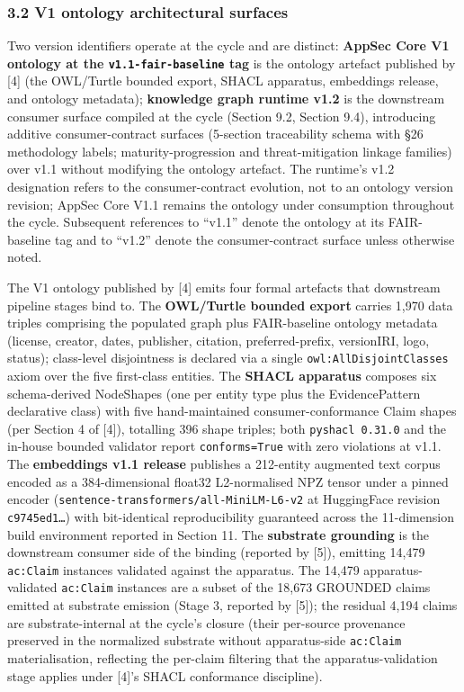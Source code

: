 \documentclass[
]{article}
\begin{document}
\subsubsection{3.2 V1 ontology architectural
surfaces}\label{v1-ontology-architectural-surfaces}

Two version identifiers operate at the cycle and are distinct:
\textbf{AppSec Core V1 ontology at the \texttt{v1.1-fair-baseline} tag}
is the ontology artefact published by {[}4{]} (the OWL/Turtle bounded
export, SHACL apparatus, embeddings release, and ontology metadata);
\textbf{knowledge graph runtime v1.2} is the downstream consumer surface
compiled at the cycle (Section 9.2, Section 9.4), introducing additive
consumer-contract surfaces (5-section traceability schema with §26
methodology labels; maturity-progression and threat-mitigation linkage
families) over v1.1 without modifying the ontology artefact. The
runtime's v1.2 designation refers to the consumer-contract evolution,
not to an ontology version revision; AppSec Core V1.1 remains the
ontology under consumption throughout the cycle. Subsequent references
to ``v1.1'' denote the ontology at its FAIR-baseline tag and to ``v1.2''
denote the consumer-contract surface unless otherwise noted.

The V1 ontology published by {[}4{]} emits four formal artefacts that
downstream pipeline stages bind to. The \textbf{OWL/Turtle bounded
export} carries 1,970 data triples comprising the populated graph plus
FAIR-baseline ontology metadata (license, creator, dates, publisher,
citation, preferred-prefix, versionIRI, logo, status); class-level
disjointness is declared via a single \texttt{owl:AllDisjointClasses}
axiom over the five first-class entities. The \textbf{SHACL apparatus}
composes six schema-derived NodeShapes (one per entity type plus the
EvidencePattern declarative class) with five hand-maintained
consumer-conformance Claim shapes (per Section 4 of {[}4{]}), totalling
396 shape triples; both \texttt{pyshacl\ 0.31.0} and the in-house
bounded validator report \texttt{conforms=True} with zero violations at
v1.1. The \textbf{embeddings v1.1 release} publishes a 212-entity
augmented text corpus encoded as a 384-dimensional float32 L2-normalised
NPZ tensor under a pinned encoder
(\texttt{sentence-transformers/all-MiniLM-L6-v2} at HuggingFace revision
\texttt{c9745ed1…}) with bit-identical reproducibility guaranteed across
the 11-dimension build environment reported in Section 11. The
\textbf{substrate grounding} is the downstream consumer side of the
binding (reported by {[}5{]}), emitting 14,479 \texttt{ac:Claim}
instances validated against the apparatus. The 14,479
apparatus-validated \texttt{ac:Claim} instances are a subset of the
18,673 GROUNDED claims emitted at substrate emission (Stage 3, reported
by {[}5{]}); the residual 4,194 claims are substrate-internal at the
cycle's closure (their per-source provenance preserved in the normalized
substrate without apparatus-side \texttt{ac:Claim} materialisation,
reflecting the per-claim filtering that the apparatus-validation stage
applies under {[}4{]}'s SHACL conformance discipline).
\end{document}
